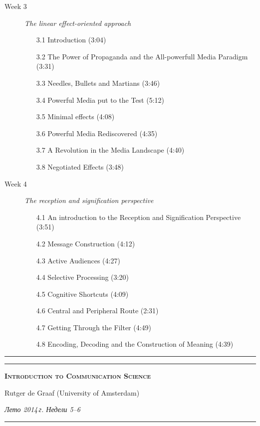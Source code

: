 \documentclass[a4paper]{article}
\begin{document}
{{\begin{description}
\item[Week 3] \textsl{The linear effect-oriented approach}
\begin{itemize}
\item[3.1] Introduction (3:04)
\item[3.2] The Power of Propaganda and the All-powerfull Media Paradigm (3:31)
\item[3.3] Needles, Bullets and Martians (3:46)
\item[3.4] Powerful Media put to the Test (5:12)
\item[3.5] Minimal effects (4:08)
\item[3.6] Powerful Media Rediscovered (4:35)
\item[3.7] A Revolution in the Media Landscape (4:40)
\item[3.8] Negotiated Effects (3:48)
\end{itemize}
\item[Week 4] \textsl{The reception and signification perspective}
\begin{itemize}
\item[4.1] An introduction to the Reception and Signification Perspective (3:51)
\item[4.2] Message Construction (4:12)
\item[4.3] Active Audiences (4:27)
\item[4.4] Selective Processing (3:20)
\item[4.5] Cognitive Shortcuts (4:09)
\item[4.6] Central and Peripheral Route (2:31)
\item[4.7] Getting Through the Filter (4:49)
\item[4.8] Encoding, Decoding and the Construction of Meaning (4:39)
\end{itemize}
\end{description}}}
\hrule
\newpage

\renewcommand{\hist}{
\begin{center}
\hrule
\medskip

\textbf{\textsc{Introduction to Communication Science}}
\smallskip

{\large\textrm{Rutger de Graaf (University of Amsterdam)}}


\smallskip

\textsl{Лето 2014\,г. Недели 5--6}
\end{center}}

\hist

\hrule
\end{document}
